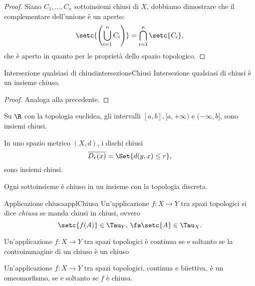 \begin{proof}
	Siano \(C_1,\dots,C_n\) sottoinsiemi chiusi di \(X\), dobbiamo dimostrare che il complementare dell'unione è un aperto:
	\[
		\setc{\left(\bigcup_{i=1}^n C_i\right)}=\bigcap_{i=1}^n\setc{C_i},
	\]
	che è aperto in quanto per le proprietà dello spazio topologico.
\end{proof}

\begin{prop}{Intersezione qualsiasi di chiusi}{intersezioneChiusi}
	Intersezione qualsiasi di chiusi è un insieme chiuso.
\end{prop}

\begin{proof}
	Analoga alla precedente.
\end{proof}
%
%
\begin{ese}
	Su \(\R\) con la topologia euclidea, gli intervalli \([a,b],[a,+\infty)\) e \((-\infty,b]\), sono insiemi chiusi.
\end{ese}

\begin{ese}
	In uno spazio metrico \((X,d)\), i dischi chiusi
	\[
		\overline{D_r(x)}=\Set{d(y,x)\le r},
	\]
	sono insiemi chiusi.
\end{ese}

\begin{ese}
	Ogni sottoinsieme è chiuso in un insieme con la topologia discreta.
\end{ese}

\begin{defn}{Applicazione chiusa}{applChiusa}
	Un'applicazione \(f\colon X\to Y\) tra spazi topologici si dice \emph{chiusa} se manda chiusi in chiusi, ovvero
	\[
		\setc{f(A)}\in \Tau_Y,\,\fa \setc{A}\in \Tau_X.
	\]
\end{defn}

\begin{oss}
	Un'applicazione \(f\colon X\to Y\) tra spazi topologici è continua se e soltanto se la controimmagine di un chiuso è un chiuso
\end{oss}

\begin{oss}
	Un'applicazione \(f\colon X\to Y\) tra spazi topologici, continua e biiettiva, è un omeomorfismo, se e soltanto se \(f\) è chiusa.
\end{oss}
